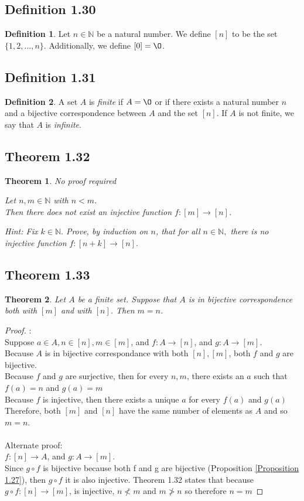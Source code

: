\documentclass[openany, amssymb, psamsfonts]{amsart}
\renewcommand{\emptyset}{\O}
\newcommand{\meta}[1]{{\color{green} #1}} %
\newtheorem{thm}{Theorem}[section]
\theoremstyle{definition}
\newtheorem{defn}{Definition}[section]
\numberwithin{equation}{section}
\begin{document}
\subsection{Definition 1.30}
\begin{defn}  
Let $n \in \mathbb{N}$ be a natural number.  We define $[n]$ to be the set $\{1, 2, \dotsc, n \}$.  
Additionally, we define $[0]=\emptyset$.
\end{defn}
\subsection{Definition 1.31}
\begin{defn}  
A set $A$ is \emph{finite} if $A=\emptyset$ or if there exists a natural number $n$ and a bijective correspondence between $A$ and the set $[n].$   If $A$ is not finite, we say that $A$ is \emph{infinite}.
\end{defn}
\subsection{Theorem 1.32}
\begin{thm}  \meta{No proof required}

Let $n, m\in {\mathbb N}$ with $n<m$.  \\ Then there does not exist an injective function
$f:[m]\rightarrow [n]$.
\end{thm}
{\it Hint: Fix $k\in\mathbb N.$ Prove, by induction on $n$, that for all $n\in\mathbb{N},$ there is no injective function $f:[n+k]\longrightarrow [n].$} 
\subsection{Theorem 1.33}
\begin{thm}
Let $A$ be a finite set. Suppose that $A$ is in bijective correspondence both with $[m]$ and with $[n]$.  Then $m = n$.
\end{thm}
\label{1.33}
\begin{proof}:\\
    Suppose $a\in A, n\in [n], m \in [m]$, and $f\colon A\rightarrow [n]$, and $g\colon A\rightarrow [m].$\\
Because $A$ is in bijective correspondance with both $[n],[m]$, both $f$ and $g$ are bijective.\\
Because $f$ and $g$ are surjective, then for every $n,m$, there exists an $a$ such that $f(a) = n$ and $g(a) =m$\\
Because $f$ is injective, then there exists a unique $a$ for every $f(a)$ and $g(a)$\\
Therefore, both $[m]$ and $[n]$ have the same number of elements as $A$ and so $m=n$. \\\\
Alternate proof:\\
$f\colon [n]\rightarrow A$, and $g\colon A\rightarrow [m].$\\
Since $g\circ f$ is bijective because both f and g are bijective (Proposition \ref{Proposition 1.27}), then $g\circ f$ it is also injective. Theorem 1.32 states that because $g\circ f: [n]\longrightarrow [m]$, is injective, $n\not < m$ and $m\not > n$ so therefore $n=m$
\end{proof}
\end{document}
